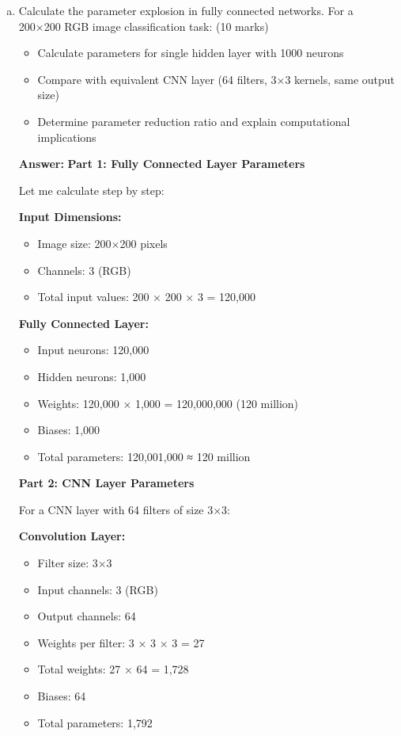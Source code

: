 \documentclass[12pt]{article}
\newcommand{\answer}[1]{{\color{answercolor}\textbf{Answer:} #1}}
\newcommand{\explanation}[1]{{\color{explanationcolor}#1}}
\begin{document}
\begin{enumerate}[(a)]
    \item Calculate the parameter explosion in fully connected networks. For a 200×200 RGB image classification task: \hfill (10 marks)
    \begin{itemize}
        \item Calculate parameters for single hidden layer with 1000 neurons
        \item Compare with equivalent CNN layer (64 filters, 3×3 kernels, same output size)
        \item Determine parameter reduction ratio and explain computational implications
    \end{itemize}
    
    \answer{
    \textbf{Part 1: Fully Connected Layer Parameters}
    
    \explanation{
    Let me calculate step by step:
    
    \textbf{Input Dimensions:}
    \begin{itemize}
        \item Image size: 200×200 pixels
        \item Channels: 3 (RGB)
        \item Total input values: 200 × 200 × 3 = 120,000
    \end{itemize}
    
    \textbf{Fully Connected Layer:}
    \begin{itemize}
        \item Input neurons: 120,000
        \item Hidden neurons: 1,000
        \item Weights: 120,000 × 1,000 = 120,000,000 (120 million)
        \item Biases: 1,000
        \item Total parameters: 120,001,000 ≈ 120 million
    \end{itemize}
    }
    
    \textbf{Part 2: CNN Layer Parameters}
    
    \explanation{
    For a CNN layer with 64 filters of size 3×3:
    
    \textbf{Convolution Layer:}
    \begin{itemize}
        \item Filter size: 3×3
        \item Input channels: 3 (RGB)
        \item Output channels: 64
        \item Weights per filter: 3 × 3 × 3 = 27
        \item Total weights: 27 × 64 = 1,728
        \item Biases: 64
        \item Total parameters: 1,792
    \end{itemize}
    
}}
\end{enumerate}
\end{document}

